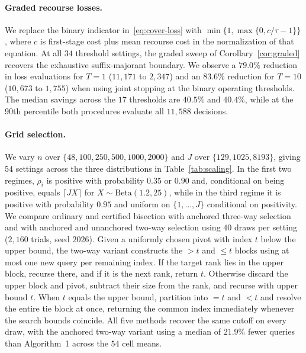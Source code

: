 \documentclass[a4paper,10pt]{article}
\theoremstyle{plain}
\theoremstyle{remark}
\begin{document}
\paragraph{Graded recourse losses.} We replace the binary indicator in~\eqref{eq:cover-loss} with $\min\{1,\max\{0,c/\tau-1\}\}$, where $c$ is first-stage cost plus mean recourse cost in the normalization of that equation. At all $34$ threshold settings, the graded sweep of Corollary~\ref{cor:graded} recovers the exhaustive suffix-majorant boundary. We observe a $79.0\%$ reduction in loss evaluations for $T=1$ ($11{,}171$ to $2{,}347$) and an $83.6\%$ reduction for $T=10$ ($10{,}673$ to $1{,}755$) when using joint stopping at the binary operating thresholds. The median savings across the $17$ thresholds are $40.5\%$ and $40.4\%$, while at the 90th percentile both procedures evaluate all $11{,}588$ decisions.

\paragraph{Grid selection.} We vary $n$ over $\{48,100,250,500,1000,2000\}$ and $J$ over $\{129,1025,8193\}$, giving $54$ settings across the three distributions in Table~\ref{tab:scaling}. In the first two regimes, $\rho_i$ is positive with probability $0.35$ or $0.90$ and, conditional on being positive, equals $\lceil JX\rceil$ for $X\sim\mathrm{Beta}(1.2,25)$, while in the third regime it is positive with probability $0.95$ and uniform on $\{1,\ldots,J\}$ conditional on positivity. We compare ordinary and certified bisection with anchored three-way selection and with anchored and unanchored two-way selection using $40$ draws per setting ($2{,}160$ trials, seed $2026$). Given a uniformly chosen pivot with index $t$ below the upper bound, the two-way variant constructs the $>t$ and $\le t$ blocks using at most one new query per remaining index. If the target rank lies in the upper block, recurse there, and if it is the next rank, return $t$. Otherwise discard the upper block and pivot, subtract their size from the rank, and recurse with upper bound $t$. When $t$ equals the upper bound, partition into $=t$ and $<t$ and resolve the entire tie block at once, returning the common index immediately whenever the search bounds coincide. All five methods recover the same cutoff on every draw, with the anchored two-way variant using a median of $21.9\%$ fewer queries than Algorithm~1 across the $54$ cell means.
\end{document}
